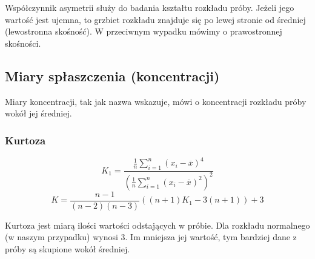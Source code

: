 \documentclass{article}
\theoremstyle{break}
\begin{document}
	Współczynnik asymetrii służy do badania kształtu rozkładu próby. Jeżeli jego wartość jest ujemna, to grzbiet rozkładu znajduje się po lewej stronie od średniej (lewostronna skośność). W przeciwnym wypadku mówimy o prawostronnej skośności. 
	
	\subsection{Miary spłaszczenia (koncentracji)}
	
	Miary koncentracji, tak jak nazwa wskazuje, mówi o koncentracji rozkładu próby wokół jej średniej.
	
	\subsubsection{Kurtoza}
	$$K_1 =\frac{\frac{1}{n}\sum\limits_{i=1}^{n}(x_i-\overline{x})^4}{(\frac{1}{n}\sum\limits_{i=1}^{n}(x_i-\overline{x})^2)^2}$$
	$$K=\frac{n-1}{(n-2)(n-3)}((n+1)K_1-3(n+1))+3$$
	
	Kurtoza jest miarą ilości wartości odstających w próbie. Dla rozkładu normalnego (w naszym przypadku) wynosi 3. Im mniejsza jej wartość, tym bardziej dane z próby są skupione wokół średniej.
	
\end{document}
